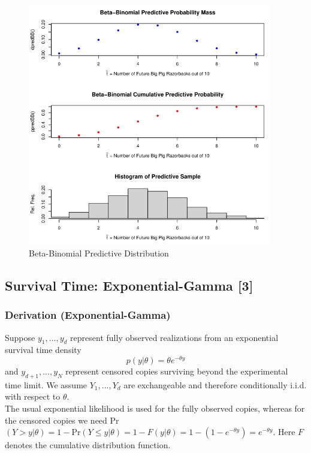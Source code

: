 \documentclass[12pt, a4paper]{article}
\begin{document}
\begin{figure}[ht]
  \centering
  \includegraphics[width=0.95\textwidth]{./Graphics/DistributionPlots/BetaBinomial}
  \caption{Beta-Binomial Predictive Distribution}
  \label{fig:BBdist}
\end{figure}

\vspace{2cm}




    \subsection{Survival Time:  Exponential-Gamma [3]}

    \subsubsection{Derivation (Exponential-Gamma)}

Suppose $y_1,...,y_d$ represent fully observed realizations from an exponential survival time density
          $$p(y|\theta) = \theta e^{-\theta y}$$
      and $y_{d+1},...,y_N$ represent censored copies surviving beyond the experimental time limit.  We assume $Y_1,...,Y_d$ are exchangeable and therefore conditionally i.i.d. with respect to $\theta$.\\

\noindent The usual exponential likelihood is used for the fully observed copies, whereas for the censored copies we need Pr$(Y > y | \theta) = 1 - \text{Pr}(Y\leq y | \theta) = 1 - F(y|\theta) = 1 - (1 - e^{-\theta y}) = e^{-\theta y}$.  Here $F$ denotes the cumulative distribution function.\\
\end{document}
